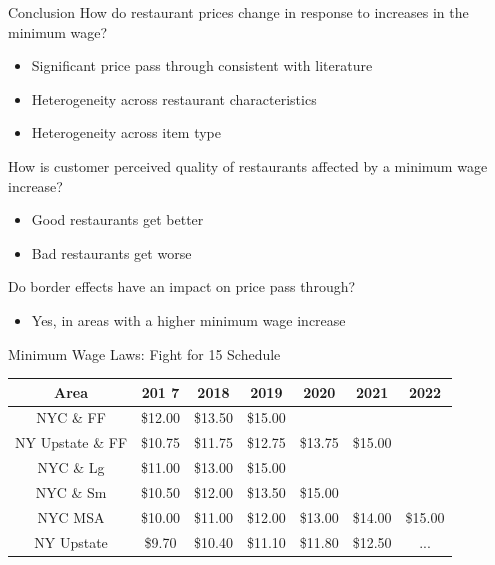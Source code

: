 \documentclass[xcolor=table]{beamer}
\begin{document}
\begin{spacing}{1.2}
\begin{frame}{Conclusion}
 How do restaurant prices change in response to increases in the minimum wage?
\begin{itemize}
\item Significant price pass through consistent with literature
\item Heterogeneity across restaurant characteristics
\item Heterogeneity across item type
\end{itemize}
 How is customer perceived quality of restaurants affected by a minimum wage increase?
\begin{itemize}
\item Good restaurants get better
\item Bad restaurants get worse
\end{itemize}
 Do border effects have an impact on price pass through?
\begin{itemize}
\item Yes, in areas with a higher minimum wage increase
\end{itemize}
\end{frame}


\begin{frame}[label=supplemental]{Minimum Wage Laws: Fight for 15 Schedule}
\footnotesize
\centering
\begin{tabular}{ c c c c c c c} \\ \hline \hline
 Area & 201 7& 2018 & 2019 & 2020 & 2021 & 2022 \\ \hline \hline
 NYC \& FF & \$12.00 & \$13.50 & \$15.00 \\
 NY Upstate \& FF  & \$10.75 & \$11.75 & \$12.75 & \$13.75 & \$15.00 \\
NYC \& Lg & \$11.00 & \$13.00 & \$15.00 \\
NYC \& Sm & \$10.50 & \$12.00 & \$13.50 & \$15.00 \\
NYC MSA & \$10.00 & \$11.00 & \$12.00 & \$13.00 & \$14.00 &  \$15.00 \\
NY Upstate &\$9.70 & \$10.40 & \$11.10 &  \$11.80 & \$12.50 & ... \\
\end{tabular}

\bigskip

\raggedleft
\hyperlink{main}{}
\end{frame}


\end{spacing}
\end{document}
